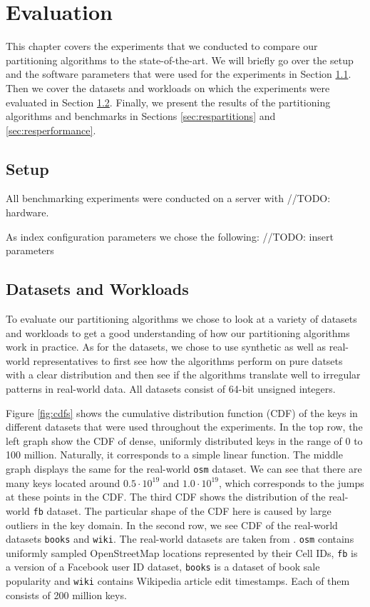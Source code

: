 \thispagestyle{plain}
\chapter{Evaluation}

This chapter covers the experiments that we conducted to compare our partitioning algorithms to the state-of-the-art. We will briefly go over the setup and the software parameters that were used for the experiments in Section \ref{sec:setup}. Then we cover the datasets and workloads on which the experiments were evaluated in Section \ref{sec:datasets}. Finally, we present the results of the partitioning algorithms and benchmarks in Sections \ref{sec:respartitions} and \ref{sec:resperformance}.

\section{Setup}\label{sec:setup}
All benchmarking experiments were conducted on a server with //TODO: hardware.

As index configuration parameters we chose the following:
//TODO: insert parameters


\section{Datasets and Workloads}\label{sec:datasets}

To evaluate our partitioning algorithms we chose to look at a variety of datasets and workloads to get a good understanding of how our partitioning algorithms work in practice. As for the datasets, we chose to use synthetic as well as real-world representatives to first see how the algorithms perform on pure datsets with a clear distribution and then see if the algorithms translate well to irregular patterns in real-world data. All datasets consist of 64-bit unsigned integers.

Figure \ref{fig:cdfs} shows the cumulative distribution function (CDF) of the keys in different datasets that were used throughout the experiments. In the top row, the left graph show the CDF of dense, uniformly distributed keys in the range of 0 to 100 million. Naturally, it corresponds to a simple linear function. The middle graph displays the same for the real-world \verb|osm| dataset. We can see that there are many keys located around $0.5 \cdot 10^{19}$ and $1.0 \cdot 10^{19}$, which corresponds to the jumps at these points in the CDF. The third CDF shows the distribution of the real-world \verb|fb| dataset. The particular shape of the CDF here is caused by large outliers in the key domain. In the second row, we see CDF of the real-world datasets \verb|books| and \verb|wiki|. The real-world datasets are taken from \citeauthor{Kipf2019} \cite{Kipf2019}. \verb|osm| contains uniformly sampled OpenStreetMap locations represented by their Cell IDs, \verb|fb| is a version of a Facebook user ID dataset, \verb|books| is a dataset of book sale popularity and \verb|wiki| contains Wikipedia article edit timestamps. Each of them consists of 200 million keys.

